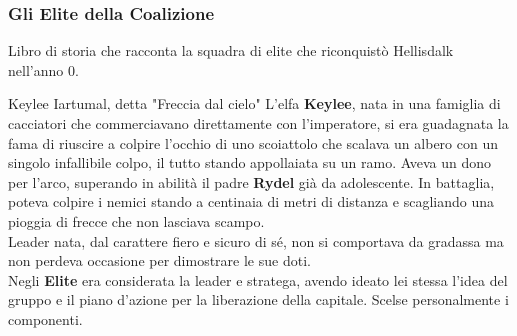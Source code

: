 \documentclass[10pt,twoside,onecolumn,openany]{book}
\begin{document}
\subsubsection{Gli Elite della Coalizione}
Libro di storia che racconta la squadra di elite che riconquistò Hellisdalk nell'anno 0.
\begin{paperbox}{{Keylee Iartumal, detta "Freccia dal cielo"}}
	L'elfa \textbf{Keylee}, nata in una famiglia di cacciatori che commerciavano direttamente con l'imperatore, si era guadagnata la fama di riuscire a colpire l'occhio di uno scoiattolo che scalava un albero con un singolo infallibile colpo, il tutto stando appollaiata su un ramo. Aveva un dono per l'arco, superando in abilità il padre \textbf{Rydel} già da adolescente. In battaglia, poteva colpire i nemici stando a centinaia di metri di distanza e scagliando una pioggia di frecce che non lasciava scampo.\\
	Leader nata, dal carattere fiero e sicuro di sé, non si comportava da gradassa ma non perdeva occasione per dimostrare le sue doti.\\
	Negli \textbf{Elite} era considerata la leader e stratega, avendo ideato lei stessa l'idea del gruppo e il piano d'azione per la liberazione della capitale. Scelse personalmente i componenti.\\
\end{paperbox}
\end{document}
